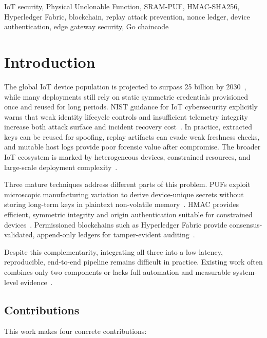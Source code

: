 \documentclass[conference]{IEEEtran}
\begin{document}
\begin{IEEEkeywords}
IoT security, Physical Unclonable Function, SRAM-PUF, HMAC-SHA256,
Hyperledger Fabric, blockchain, replay attack prevention, nonce ledger,
device authentication, edge gateway security, Go chaincode
\end{IEEEkeywords}

\section{Introduction}
\label{sec:intro}

The global IoT device population is projected to surpass 25 billion by
2030~\cite{ericsson2023}, while many deployments still rely on static symmetric
credentials provisioned once and reused for long periods. NIST guidance for IoT
cybersecurity explicitly warns that weak identity lifecycle controls and
insufficient telemetry integrity increase both attack surface and incident
recovery cost~\cite{nist8228}. In practice, extracted keys can be reused for
spoofing, replay artifacts can evade weak freshness checks, and mutable host logs
provide poor forensic value after compromise.
The broader IoT ecosystem is marked by heterogeneous devices, constrained
resources, and large-scale deployment complexity~\cite{atzori2010internet}.

Three mature techniques address different parts of this problem.
PUFs exploit microscopic manufacturing variation to derive device-unique secrets
without storing long-term keys in plaintext non-volatile memory~\cite{herder2014puf,suh2007physical}.
HMAC provides efficient, symmetric integrity and origin authentication suitable
for constrained devices~\cite{rfc2104}. Permissioned blockchains such as
Hyperledger Fabric provide consensus-validated, append-only ledgers for
tamper-evident auditing~\cite{fabric_docs}.

Despite this complementarity, integrating all three into a low-latency,
reproducible, end-to-end pipeline remains difficult in practice. Existing work
often combines only two components or lacks full automation and measurable
system-level evidence~\cite{lee2020puf,xu2018blendcac}.

\subsection{Contributions}

This work makes four concrete contributions:
\end{document}
